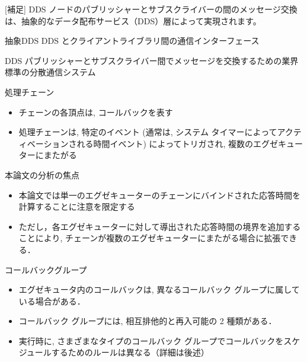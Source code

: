 \begin{frame}{[補足] DDS}
    ノードのパブリッシャーとサブスクライバーの間のメッセージ交換は、抽象的なデータ配布サービス（DDS）層によって実現されます。

    \begin{block}{抽象DDS}
        DDS とクライアントライブラリ間の通信インターフェース
    \end{block}
    \begin{block}{DDS}
        パブリッシャーとサブスクライバー間でメッセージを交換するための業界標準の分散通信システム
    \end{block}
\end{frame}

\begin{frame}{処理チェーン}
    \begin{itemize}
        \item チェーンの各頂点は, コールバックを表す
        \item 処理チェーンは, 特定のイベント (通常は, システム タイマーによってアクティベーションされる時間イベント) によってトリガされ, 複数のエグゼキューターにまたがる
    \end{itemize}

    \centering
\end{frame}

\begin{frame}{本論文の分析の焦点}
    \begin{itemize}
        \item 本論文では単一のエグゼキューターのチェーンにバインドされた応答時間を計算することに注意を限定する
        \item ただし，各エグゼキューターに対して導出された応答時間の境界を追加することにより, チェーンが複数のエグゼキューターにまたがる場合に拡張できる．
    \end{itemize}

    \centering
\end{frame}

\begin{frame}{コールバックグループ}
    \begin{itemize}
        \item エグゼキュータ内のコールバックは, 異なるコールバック グループに属している場合がある．
        \item コールバック グループには, 相互排他的と再入可能の 2 種類がある．
        \item 実行時に, さまざまなタイプのコールバック グループでコールバックをスケジュールするためのルールは異なる（詳細は後述）
    \end{itemize}
\end{frame}

